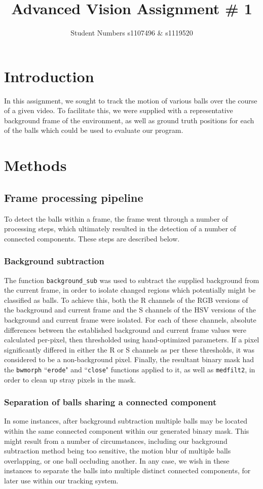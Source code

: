 \documentclass[12pt,a4paper]{article}
\begin{document}
\title{Advanced Vision Assignment \# 1}
\author{Student Numbers s1107496 \& s1119520}

\maketitle

\section{Introduction}
In this assignment, we sought to track the motion of various balls over the course of a given video. To facilitate this, we were supplied with a representative background frame of the environment, as well as ground truth positions for each of the balls which could be used to evaluate our program.

\section{Methods}

\subsection{Frame processing pipeline}
To detect the balls within a frame, the frame went through a number of processing steps, which ultimately resulted in the detection of a number of connected components. These steps are described below.
\subsubsection{Background subtraction}
The function \texttt{background\_sub} was used to subtract the supplied background from the current frame, in order to isolate changed regions which potentially might be classified as balls. To achieve this, both the R channels of the RGB versions of the background and current frame and the S channels of the HSV versions of the background and current frame were isolated. For each of these channels, absolute differences between the established background and current frame values were calculated per-pixel, then thresholded using hand-optimized parameters. If a pixel significantly differed in either the R or S channels as per these thresholds, it was considered to be a non-background pixel. Finally, the resultant binary mask had the \texttt{bwmorph} ``\texttt{erode}" and ``\texttt{close}" functions applied to it, as well as \texttt{medfilt2}, in order to clean up stray pixels in the mask. 
\subsubsection{Separation of balls sharing a connected component}
In some instances, after background subtraction multiple balls may be located within the same connected component within our generated binary mask. This might result from a number of circumstances, including our background subtraction method being too sensitive, the motion blur of multiple balls overlapping, or one ball occluding another. In any case, we wish in these instances to separate the balls into multiple distinct connected components, for later use within our tracking system. 
\end{document}

